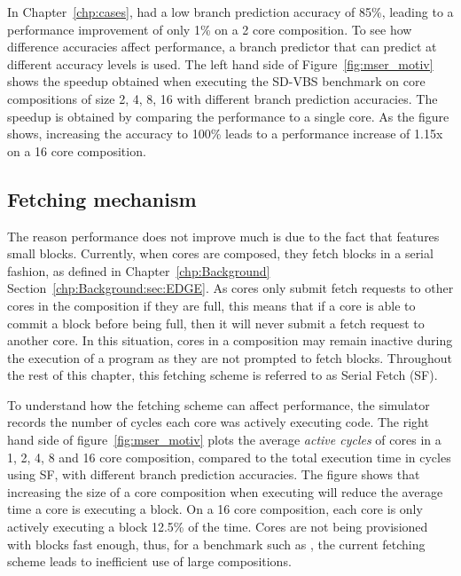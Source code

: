 In Chapter~\ref{chp:cases},  had a low branch prediction accuracy of 85\%, leading to a performance improvement of only 1\% on a 2 core composition.
To see how difference accuracies affect performance, a branch predictor that can predict at different accuracy levels is used.
The left hand side of Figure~\ref{fig:mser_motiv} shows the speedup obtained when executing the SD-VBS benchmark  on core compositions of size 2, 4, 8, 16 with different branch prediction accuracies.
The speedup is obtained by comparing the performance to a single core.
As the figure shows, increasing the accuracy to 100\% leads to a performance increase of 1.15x on a 16 core composition.


\subsection{Fetching mechanism}
The reason performance does not improve much is due to the fact that  features small blocks.
Currently, when cores are composed, they fetch blocks in a serial fashion, as defined in Chapter~\ref{chp:Background} Section~\ref{chp:Background:sec:EDGE}.
As cores only submit fetch requests to other cores in the composition if they are full, this means that if a core is able to commit a block before being full, then it will never submit a fetch request to another core.
In this situation, cores in a composition may remain inactive during the execution of a program as they are not prompted to fetch blocks.
Throughout the rest of this chapter, this fetching scheme is referred to as Serial Fetch (SF).%

To understand how the fetching scheme can affect performance, the simulator records the number of cycles each core was actively executing code.
The right hand side of figure~\ref{fig:mser_motiv} plots the average \textit{active cycles} of cores in a 1, 2, 4, 8 and 16 core composition, compared to the total execution time in cycles using SF, with different branch prediction accuracies.
The figure shows that increasing the size of a core composition when executing  will reduce the average time a core is executing a block.
On a 16 core composition, each core is only actively executing a block 12.5\% of the time.
Cores are not being provisioned with blocks fast enough, thus, for a benchmark such as , the current fetching scheme leads to inefficient use of large compositions.

